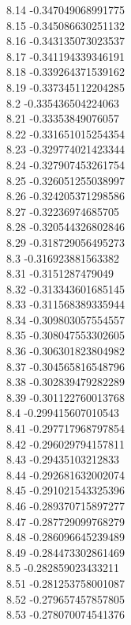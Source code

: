 {8.14	-0.347049068991775\\
8.15	-0.345086630251132\\
8.16	-0.343135073023537\\
8.17	-0.341194339346191\\
8.18	-0.339264371539162\\
8.19	-0.337345112204285\\
8.2	-0.335436504224063\\
8.21	-0.33353849076057\\
8.22	-0.331651015254354\\
8.23	-0.329774021423344\\
8.24	-0.327907453261754\\
8.25	-0.326051255038997\\
8.26	-0.324205371298586\\
8.27	-0.32236974685705\\
8.28	-0.320544326802846\\
8.29	-0.318729056495273\\
8.3	-0.316923881563382\\
8.31	-0.3151287479049\\
8.32	-0.313343601685145\\
8.33	-0.311568389335944\\
8.34	-0.309803057554557\\
8.35	-0.308047553302605\\
8.36	-0.306301823804982\\
8.37	-0.304565816548796\\
8.38	-0.302839479282289\\
8.39	-0.301122760013768\\
8.4	-0.299415607010543\\
8.41	-0.297717968797854\\
8.42	-0.296029794157811\\
8.43	-0.29435103212833\\
8.44	-0.292681632002074\\
8.45	-0.291021543325396\\
8.46	-0.289370715897277\\
8.47	-0.287729099768279\\
8.48	-0.286096645239489\\
8.49	-0.284473302861469\\
8.5	-0.282859023433211\\
8.51	-0.281253758001087\\
8.52	-0.279657457857805\\
8.53	-0.278070074541376\\
}
